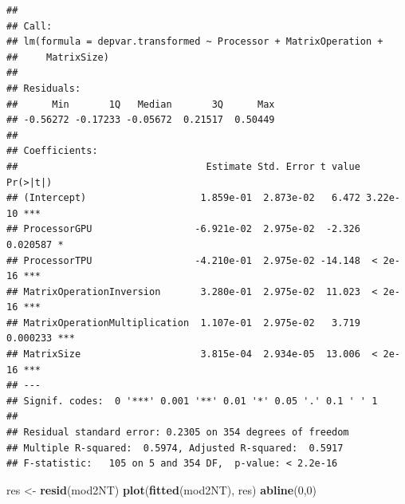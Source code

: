 \documentclass[
]{article}
\newenvironment{Shaded}{\begin{snugshade}}{\end{snugshade}}
\newcommand{\DecValTok}[1]{\textcolor[rgb]{0.00,0.00,0.81}{#1}}
\newcommand{\KeywordTok}[1]{\textcolor[rgb]{0.13,0.29,0.53}{\textbf{#1}}}
\newcommand{\NormalTok}[1]{#1}
\newcommand{\OperatorTok}[1]{\textcolor[rgb]{0.81,0.36,0.00}{\textbf{#1}}}
\newcommand{\StringTok}[1]{\textcolor[rgb]{0.31,0.60,0.02}{#1}}
\begin{document}
\begin{Shaded}
\end{Shaded}

\begin{verbatim}
## 
## Call:
## lm(formula = depvar.transformed ~ Processor + MatrixOperation + 
##     MatrixSize)
## 
## Residuals:
##      Min       1Q   Median       3Q      Max 
## -0.56272 -0.17233 -0.05672  0.21517  0.50449 
## 
## Coefficients:
##                                 Estimate Std. Error t value Pr(>|t|)    
## (Intercept)                    1.859e-01  2.873e-02   6.472 3.22e-10 ***
## ProcessorGPU                  -6.921e-02  2.975e-02  -2.326 0.020587 *  
## ProcessorTPU                  -4.210e-01  2.975e-02 -14.148  < 2e-16 ***
## MatrixOperationInversion       3.280e-01  2.975e-02  11.023  < 2e-16 ***
## MatrixOperationMultiplication  1.107e-01  2.975e-02   3.719 0.000233 ***
## MatrixSize                     3.815e-04  2.934e-05  13.006  < 2e-16 ***
## ---
## Signif. codes:  0 '***' 0.001 '**' 0.01 '*' 0.05 '.' 0.1 ' ' 1
## 
## Residual standard error: 0.2305 on 354 degrees of freedom
## Multiple R-squared:  0.5974, Adjusted R-squared:  0.5917 
## F-statistic:   105 on 5 and 354 DF,  p-value: < 2.2e-16
\end{verbatim}

\begin{Shaded}
\begin{Highlighting}[]
\NormalTok{res \textless{}{-}}\StringTok{ }\KeywordTok{resid}\NormalTok{(mod2NT)}
\KeywordTok{plot}\NormalTok{(}\KeywordTok{fitted}\NormalTok{(mod2NT), res)}
\KeywordTok{abline}\NormalTok{(}\DecValTok{0}\NormalTok{,}\DecValTok{0}\NormalTok{)}
\end{Highlighting}
\end{Shaded}
\end{document}
